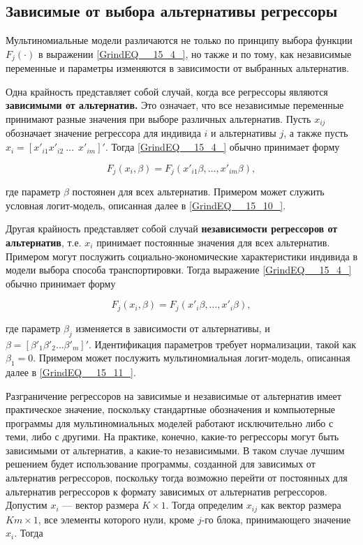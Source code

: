 \subsection{Зависимые от выбора альтернативы регрессоры}

Мультиномиальные модели различаются не только по принципу выбора функции $F_j(\cdot )$ в выражении \eqref{GrindEQ__15_4_}, но также и по тому, как  независимые переменные и параметры изменяются в зависимости от выбранных альтернатив.

Одна крайность представляет собой случай, когда все регрессоры являются \textbf{зависимыми от альтернатив.} Это означает, что все независимые переменные принимают разные значения при выборе различных альтернатив. Пусть $x_{ij}$ обозначает значение регрессора для индивида $i$ и альтернативы $j$, а также пусть $x_i={\left[x'_{i1}x'_{i2}\ \dots \ \ x'_{im}\right]}'.$ Тогда \eqref{GrindEQ__15_4_} обычно принимает форму

\[F_j\left(x_i,\beta \right)=F_j\left(x'_{i1}\beta ,\dots ,x'_{im}\beta \right),\] 

где параметр $\beta $ постоянен для всех альтернатив. Примером может служить условная логит-модель, описанная далее в \eqref{GrindEQ__15_10_}.

Другая крайность представляет собой случай \textbf{независимости регрессоров от альтернатив}, т.е. $x_i$ принимает постоянные значения для всех альтернатив. Примером могут послужить социально-экономические характеристики индивида в модели выбора способа транспортировки. Тогда выражение \eqref{GrindEQ__15_4_} обычно принимает форму

\[F_j\left(x_i,\beta \right)=F_j\left(x'_i\beta ,\dots ,x'_i\beta \right),\] 

где параметр ${\beta }_j$ изменяется в зависимости от альтернативы, и $\beta ={\left[{\beta }'_1{\beta }'_2\dots {\beta }'_m\right]}'.$ Идентификация параметров требует нормализации, такой как ${\beta }_1=0.$ Примером может послужить мультиномиальная  логит-модель, описанная далее в \eqref{GrindEQ__15_11_}.

Разграничение регрессоров на зависимые и независимые от альтернатив имеет практическое значение, поскольку стандартные обозначения и компьютерные программы для мультиномиальных моделей работают исключительно либо с теми, либо с другими. На практике, конечно, какие-то регрессоры могут быть зависимыми от альтернатив, а какие-то независимыми. В таком случае лучшим решением будет использование программы, созданной для зависимых от альтернатив регрессоров, поскольку тогда возможно перейти от постоянных для альтернатив регрессоров к формату зависимых от альтернатив регрессоров. Допустим $x_i$ --- вектор размера $K\times 1$. Тогда определим $x_{ij}$ как вектор размера $Km\times 1$, все элементы которого нули, кроме $j$-го блока, принимающего значение $x_i$. Тогда 

